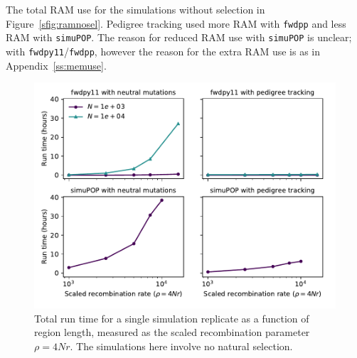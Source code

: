 \documentclass{article}
\newcommand{\simupop}{\texttt{simuPOP}}
\newcommand{\fwdpp}{\texttt{fwdpp}}
\newcommand{\fwdpy}{\texttt{fwdpy11}}
\begin{document}
The total RAM use for the
simulations without selection in Figure~\ref{sfig:ramnosel}.
Pedigree tracking used more RAM with \fwdpp{} and less
RAM with \simupop{}. The reason for reduced RAM use with \simupop{} is unclear;
with \fwdpy{}/\fwdpp{}, however the reason for the extra RAM use is as in
Appendix~\ref{ss:memuse}.

\begin{figure}[!h]
    \includegraphics[]{sims/rawspeed_nosel}
    \caption{\label{sfig:rawspeed_nosel}Total run time for a single simulation replicate as a function of region
        length, measured as the scaled recombination parameter $\rho = 4Nr$.  The simulations here involve no natural
    selection.}
\end{figure}
\end{document}
